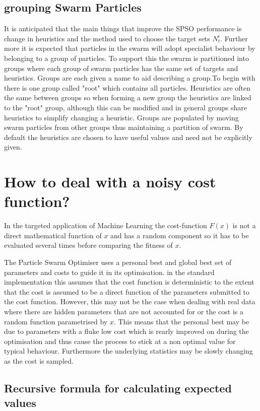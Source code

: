 \documentclass[a4paper,oneside,english]{article}
\numberwithin{equation}{section}
\numberwithin{figure}{section}
\begin{document}
\subsection{grouping Swarm Particles } 
It is anticipated  that the main things that improve the SPSO performance is change in heuristics and the method used to choose the target sets $N_t^i$. Further more it is expected that particles in the swarm will adopt specialist behaviour by belonging to a group of particles. To support this the swarm is  partitioned into groups where each group of swarm particles has the same set of targets and heuristics. Groups are each given a name to aid describing a group.To begin with there is one group called "root" which contains all particles. Heuristics are often the same between groups so when forming a new group the heuristics are linked to the "root" group, although this can be modified and in general groups share heuristics to simplify changing a heuristic. Groups are populated by moving swarm particles from other groups thus maintaining a partition of swarm. By default the heuristics are chosen to have useful values and need not be explicitly given.              
  	
\section{How to deal with a noisy cost function?}

In the targeted application of Machine Learning the cost-function $F(x)$ is not a direct mathematical function of $x$ and has a random component so it has to be evaluated several times before comparing the fitness of $x$. 

The Particle Swarm Optimiser uses a personal best and global best
set of parameters and costs to guide it in its optimisation. in the
standard implementation this assumes that the cost function is deterministic
to the extent that the cost is assumed to be a direct function of
the parameters submitted to the cost function. However, this may not
be the case when dealing with real data where there are hidden parameters
that are not accounted for or the cost is a random function parametrised
by $x$. This means that the personal best may be due
to parameters with a fluke low cost which is rearly improved on during
the optimisation and thus cause the process to stick at a non optimal
value for typical behaviour. Furthermore the underlying statistics
may be slowly changing as the cost is sampled. 

\subsection{Recursive formula for calculating expected values}
\end{document}
